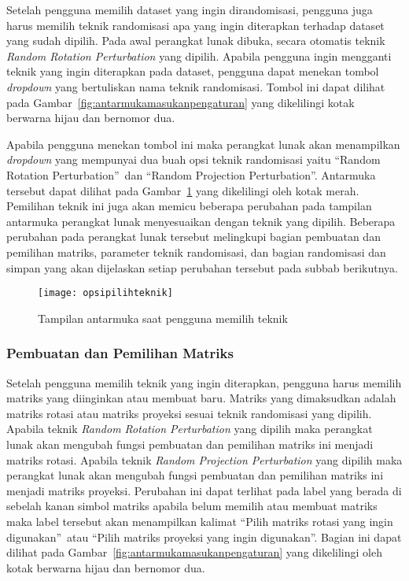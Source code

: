 Setelah pengguna memilih dataset yang ingin dirandomisasi, pengguna juga harus memilih teknik randomisasi apa yang ingin diterapkan terhadap dataset yang sudah dipilih. Pada awal perangkat lunak dibuka, secara otomatis teknik \textit{Random Rotation Perturbation} yang dipilih. Apabila pengguna ingin mengganti teknik yang ingin diterapkan pada dataset, pengguna dapat menekan tombol \textit{dropdown} yang bertuliskan nama teknik randomisasi. Tombol ini dapat dilihat pada Gambar~\ref{fig:antarmukamasukanpengaturan} yang dikelilingi kotak berwarna hijau dan bernomor dua.

Apabila pengguna menekan tombol ini maka perangkat lunak akan menampilkan \textit{dropdown} yang mempunyai dua buah opsi teknik randomisasi yaitu \textquotedblleft Random Rotation Perturbation\textquotedblright~dan \textquotedblleft Random Projection Perturbation\textquotedblright. Antarmuka tersebut dapat dilihat pada Gambar~\ref{fig:opsipilihteknik} yang dikelilingi oleh kotak merah. Pemilihan teknik ini juga akan memicu beberapa perubahan pada tampilan antarmuka perangkat lunak menyesuaikan dengan teknik yang dipilih. Beberapa perubahan pada perangkat lunak tersebut melingkupi bagian pembuatan dan pemilihan matriks, parameter teknik randomisasi, dan bagian randomisasi dan simpan yang akan dijelaskan setiap perubahan tersebut pada subbab berikutnya.

\begin{figure}
	\centering
	\texttt{[image: opsipilihteknik]}
	\caption{Tampilan antarmuka saat pengguna memilih teknik}
	\label{fig:opsipilihteknik}
\end{figure}

\subsubsection{Pembuatan dan Pemilihan Matriks}
\label{sec:pilihmatriks}

Setelah pengguna memilih teknik yang ingin diterapkan, pengguna harus memilih matriks yang diinginkan atau membuat baru. Matriks yang dimaksudkan adalah matriks rotasi atau matriks proyeksi sesuai teknik randomisasi yang dipilih. Apabila teknik \textit{Random Rotation Perturbation} yang dipilih maka perangkat lunak akan mengubah fungsi pembuatan dan pemilihan matriks ini menjadi matriks rotasi. Apabila teknik \textit{Random Projection Perturbation} yang dipilih maka perangkat lunak akan mengubah fungsi pembuatan dan pemilihan matriks ini menjadi matriks proyeksi. Perubahan ini dapat terlihat pada label yang berada di sebelah kanan simbol matriks apabila belum memilih atau membuat matriks maka label tersebut akan menampilkan kalimat \textquotedblleft Pilih matriks rotasi yang ingin digunakan\textquotedblright~atau \textquotedblleft Pilih matriks proyeksi yang ingin digunakan\textquotedblright. Bagian ini dapat dilihat pada Gambar~\ref{fig:antarmukamasukanpengaturan} yang dikelilingi oleh kotak berwarna hijau dan bernomor dua.

